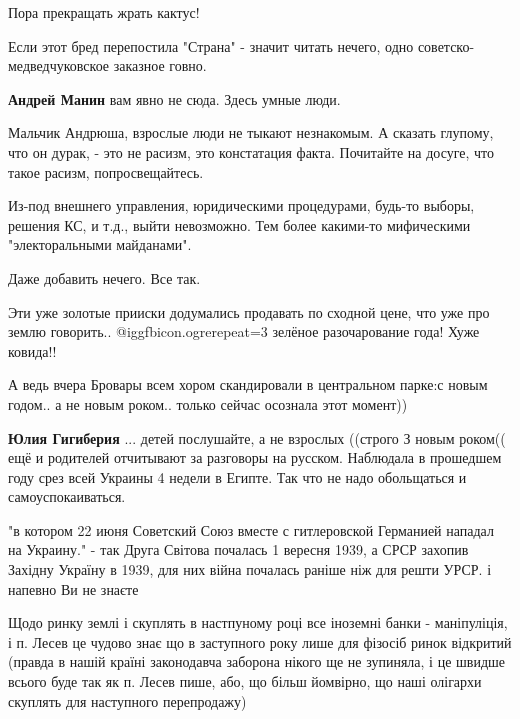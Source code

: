 \begin{itemize}
Пора прекращать жрать кактус!

Если этот бред перепостила "Страна" - значит читать нечего, одно советско-медведчуковское заказное говно.

\begin{itemize} %
\textbf{Андрей Манин} вам явно не сюда. Здесь умные люди.


Мальчик Андрюша, взрослые люди не тыкают незнакомым. А сказать глупому, что он
дурак, - это не расизм, это констатация факта. Почитайте на досуге, что такое
расизм, попросвещайтесь.

\end{itemize} %


Из-под внешнего управления, юридическими процедурами, будь-то выборы, решения
КС, и т.д., выйти невозможно. Тем более какими-то мифическими "электоральными
майданами".

Даже добавить нечего. Все так.


Эти уже золотые прииски додумались продавать по сходной цене, что уже про землю
говорить.. @igg{fbicon.ogre}{repeat=3}  зелёное разочарование года! Хуже ковида!!


А ведь вчера Бровары всем хором скандировали в центральном парке:с новым
годом.. а не новым роком.. только сейчас осознала этот момент))

\begin{itemize} %
\textbf{Юлия Гигиберия} ... детей послушайте, а не взрослых ((строго З новым роком(( ещё и родителей отчитывают за разговоры на русском. Наблюдала в прошедшем году срез всей Украины 4 недели в Египте. Так что не надо обольщаться и самоуспокаиваться.
\end{itemize} %


"в котором 22 июня Советский Союз вместе с гитлеровской Германией нападал на
Украину." - так Друга Світова почалась 1 вересня 1939, а СРСР захопив Західну
Україну в 1939, для них війна почалась раніше ніж для решти УРСР. і напевно Ви
не знаєте

Щодо ринку землі і скуплять в настпуному році все іноземні банки - маніпуліція,
і п. Лесев це чудово знає що в заступного року лише для фізосіб ринок відкритий
(правда в нашій країні законодавча заборона нікого ще не зупиняла, і це швидше
всього буде так як п. Лесев пише, або, що більш йомвірно, що наші олігархи
скуплять для наступного перепродажу)


\end{itemize}
